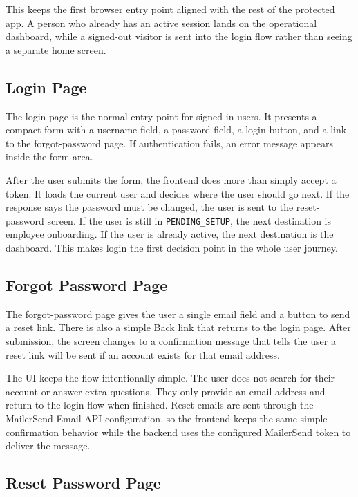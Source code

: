 \documentclass[11pt]{article}
\newcommand{\code}[1]{\nolinkurl{#1}}
\begin{document}
This keeps the first browser entry point aligned with the rest of the protected app. A person who already has an active session lands on the operational dashboard, while a signed-out visitor is sent into the login flow rather than seeing a separate home screen.

\subsection{Login Page}

The login page is the normal entry point for signed-in users. It presents a compact form with a username field, a password field, a login button, and a link to the forgot-password page. If authentication fails, an error message appears inside the form area.

After the user submits the form, the frontend does more than simply accept a token. It loads the current user and decides where the user should go next. If the response says the password must be changed, the user is sent to the reset-password screen. If the user is still in \code{PENDING_SETUP}, the next destination is employee onboarding. If the user is already active, the next destination is the dashboard. This makes login the first decision point in the whole user journey.

\subsection{Forgot Password Page}

The forgot-password page gives the user a single email field and a button to send a reset link. There is also a simple Back link that returns to the login page. After submission, the screen changes to a confirmation message that tells the user a reset link will be sent if an account exists for that email address.

The UI keeps the flow intentionally simple. The user does not search for their account or answer extra questions. They only provide an email address and return to the login flow when finished. Reset emails are sent through the MailerSend Email API configuration, so the frontend keeps the same simple confirmation behavior while the backend uses the configured MailerSend token to deliver the message.

\subsection{Reset Password Page}
\end{document}
